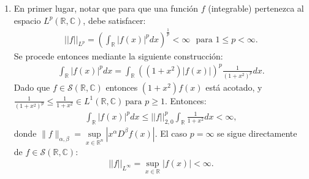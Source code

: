 \documentclass[spanish, fleqn]{article}
\begin{document}
\begin{description}
\begin{enumerate}
		\item En primer lugar, notar que para que una función $f$ (integrable) pertenezca al espacio $L^p(\mathbb{R}, \mathbb{C})$, debe satisfacer:
		\begin{align*}
		 	||f||_{L^p} = \left( \int_{\mathbb{R}} |f(x)|^p dx \right)^{\frac{1}{p}} < \infty  \ \ \ \text{para } 1 \leq p < \infty.
		\end{align*}
		Se procede entonces mediante la siguiente construcción:
		\begin{align*}
			\int_{\mathbb{R}} \left|f(x)\right|^p dx = \int_{\mathbb{R}} \left((1+x^2)|f(x)|\right)^p\frac{1}{(1+x^2)^p} dx.
		\end{align*}
		Dado que $f  \in \mathcal{S}(\mathbb{R},\mathbb{C})$ entonces  $(1+x^2)f(x)$ está acotado, y $\displaystyle \frac{1}{(1+x^2)^p} \leq \frac{1}{1+x^2} \in L^1(\mathbb{R}, \mathbb{C}) \ \text{para } p\geq 1 $. Entonces:
		\begin{align*}
			\int_{\mathbb{R}} |f(x)|^p dx \leq ||f||_{2,0}^p \int_{\mathbb{R}} \frac{1}{1+x^2} dx < \infty,
		\end{align*}
		donde $\displaystyle \|f\|_{\alpha,\beta} = \underset{x\in\mathbb{R}^n}{\sup} |x^\alpha D^\beta f(x)|$. El caso $p = \infty$ se sigue directamente de  $f \in \mathcal{S}(\mathbb{R},\mathbb{C})$:
		\begin{align*}
		 	||f||_{L^\infty} = \sup_{x \in \mathbb{R}} \left|f(x)\right| < \infty.
		 \end{align*} 
	\end{enumerate}





\end{description}
\end{document}
